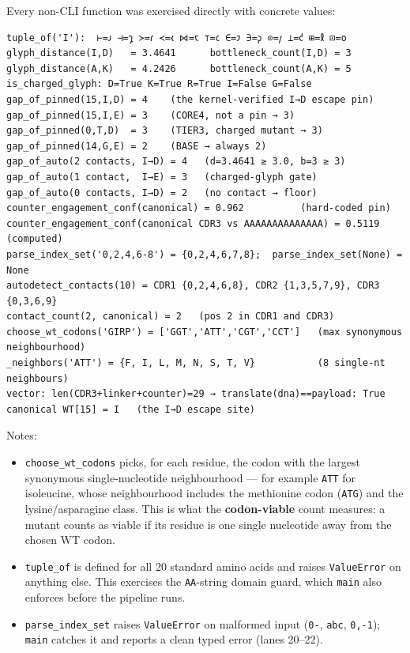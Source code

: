 \documentclass[12pt,a4paper]{article}
\providecommand{\tightlist}{%
  \setlength{\itemsep}{0pt}\setlength{\parskip}{0pt}%
}
\begin{document}
Every non-CLI function was exercised directly with concrete values:

\begin{verbatim}
tuple_of('I'):  ⊢=𐑨 ⊣=𐑡 ≻=𐑩 ≺=𐑬 ⋈=𐑱 ⊤=𐑤 ∈=𐑲 ∋=𐑜 ⊙=𐑢 ⊥=𐑒 ⊞=𐑙 ⊡=𐑴
glyph_distance(I,D)   = 3.4641      bottleneck_count(I,D) = 3
glyph_distance(A,K)   = 4.2426      bottleneck_count(A,K) = 5
is_charged_glyph: D=True K=True R=True I=False G=False
gap_of_pinned(15,I,D) = 4    (the kernel-verified I→D escape pin)
gap_of_pinned(15,I,E) = 3    (CORE4, not a pin → 3)
gap_of_pinned(0,T,D)  = 3    (TIER3, charged mutant → 3)
gap_of_pinned(14,G,E) = 2    (BASE → always 2)
gap_of_auto(2 contacts, I→D) = 4   (d=3.4641 ≥ 3.0, b=3 ≥ 3)
gap_of_auto(1 contact,  I→E) = 3   (charged-glyph gate)
gap_of_auto(0 contacts, I→D) = 2   (no contact → floor)
counter_engagement_conf(canonical) = 0.962          (hard-coded pin)
counter_engagement_conf(canonical CDR3 vs AAAAAAAAAAAAAA) = 0.5119  (computed)
parse_index_set('0,2,4,6-8') = {0,2,4,6,7,8};  parse_index_set(None) = None
autodetect_contacts(10) = CDR1 {0,2,4,6,8}, CDR2 {1,3,5,7,9}, CDR3 {0,3,6,9}
contact_count(2, canonical) = 2   (pos 2 in CDR1 and CDR3)
choose_wt_codons('GIRP') = ['GGT','ATT','CGT','CCT']   (max synonymous neighbourhood)
_neighbors('ATT') = {F, I, L, M, N, S, T, V}           (8 single-nt neighbours)
vector: len(CDR3+linker+counter)=29 → translate(dna)==payload: True
canonical WT[15] = I   (the I→D escape site)
\end{verbatim}

Notes:

\begin{itemize}
\tightlist
\item
  \texttt{choose\_wt\_codons} picks, for each residue, the codon with
  the largest synonymous single-nucleotide neighbourhood --- for example
  \texttt{ATT} for isoleucine, whose neighbourhood includes the
  methionine codon (\texttt{ATG}) and the lysine/asparagine class. This
  is what the \textbf{codon-viable} count measures: a mutant counts as
  viable if its residue is one single nucleotide away from the chosen WT
  codon.
\item
  \texttt{tuple\_of} is defined for all 20 standard amino acids and
  raises \texttt{ValueError} on anything else. This exercises the
  \texttt{AA}-string domain guard, which \texttt{main} also enforces
  before the pipeline runs.
\item
  \texttt{parse\_index\_set} raises \texttt{ValueError} on malformed
  input (\texttt{\textquotesingle{}0-\textquotesingle{}},
  \texttt{\textquotesingle{}abc\textquotesingle{}},
  \texttt{\textquotesingle{}0,-1\textquotesingle{}}); \texttt{main}
  catches it and reports a clean typed error (lanes 20--22).
\end{itemize}
\end{document}
